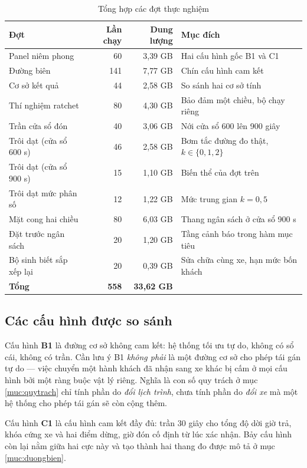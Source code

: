 \begin{table}[htbp]
\centering
\caption{Tổng hợp các đợt thực nghiệm}
\label{bang:quymo}
\small
\begin{tabular}{@{}lrrp{5.6cm}@{}}
\toprule
\textbf{Đợt} & \textbf{Lần chạy} & \textbf{Dung lượng} & \textbf{Mục đích}\\
\midrule
Panel niêm phong & 60 & 3{,}39 GB & Hai cấu hình gốc B1 và C1\\
Đường biên & 141 & 7{,}77 GB & Chín cấu hình cam kết\\
Cơ sở kết quả & 44 & 2{,}58 GB & So sánh hai cơ sở tính\\
Thí nghiệm ratchet & 80 & 4{,}30 GB & Bảo đảm một chiều, bộ chạy riêng\\
Trần cửa sổ đón & 40 & 3{,}06 GB & Nới cửa sổ 600 lên 900 giây\\
Trôi dạt (cửa sổ 600 s) & 46 & 2{,}58 GB & Bơm tắc đường đo thật, $k \in \{0,1,2\}$\\
Trôi dạt (cửa sổ 900 s) & 15 & 1{,}10 GB & Biến thể của đợt trên\\
Trôi dạt mức phân số & 12 & 1{,}22 GB & Mức trung gian $k = 0{,}5$\\
Mặt cong hai chiều & 80 & 6{,}03 GB & Thang ngân sách ở cửa sổ 900 s\\
Đặt trước ngân sách & 20 & 1{,}20 GB & Tầng cảnh báo trong hàm mục tiêu\\
Bộ sinh biết sắp xếp lại & 20 & 0{,}39 GB & Sửa chữa cùng xe, hạn mức bốn khách\\
\midrule
\textbf{Tổng} & \textbf{558} & \textbf{33{,}62 GB} & \\
\bottomrule
\end{tabular}
\end{table}

\subsection{Các cấu hình được so sánh}

Cấu hình \textbf{B1} là đường cơ sở không cam kết: hệ thống tối ưu tự do, không có sổ cái, không
có trần. Cần lưu ý B1 \emph{không phải} là một đường cơ sở cho phép tái gán tự do --- việc
chuyển một hành khách đã nhận sang xe khác bị cấm ở mọi cấu hình bởi một ràng buộc vật lý riêng.
Nghĩa là con số quy trách ở mục \ref{muc:quytrach} chỉ tính phần do \emph{đổi lịch trình}, chưa tính phần do
\emph{đổi xe} mà một hệ thống cho phép tái gán sẽ còn cộng thêm.

Cấu hình \textbf{C1} là cấu hình cam kết đầy đủ: trần 30 giây cho tổng độ dời giờ trả, khóa cứng
xe và hai điểm dừng, giờ đón cố định từ lúc xác nhận. Bảy cấu hình còn lại nằm giữa hai cực này
và tạo thành hai thang đo được mô tả ở mục \ref{muc:duongbien}.

